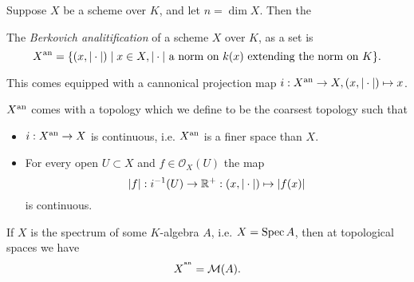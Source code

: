 
Suppose $X$ be a scheme over $K$, and let $n = \dim X$. 
Then the 
\begin{definition}
	The \emph{Berkovich analitification} of a scheme $X$ over  $K$, as a set is \[
		X{}^{\text{an}} = \{(x, |\cdot |)  \mid x\in X, |\cdot | \text{ a norm on } k(x) \text{ extending the norm on }K \} 
	.\] 

	This comes equipped with a cannonical projection map $i: X{}^{\text{an}} \to X, (x, |\cdot |) \mapsto  x$.
	
	$X{}^{\text{an}} $ comes with a topology which we define to be the coarsest topology such that 
	\begin{itemize}
		\item $i: X{}^{\text{an}} \to X$ is continuous, i.e. $X{}^{\text{an}}$ is a finer space than  $X$. 
		\item For every open $U \subset X$ and $f \in \mathcal{O}_X(U)$ the map  \[
				|f|: i^{-1}(U) \to \mathbb{R}^{+}: (x, |\cdot |) \mapsto  |f(x)|
		\] 
		is continuous.
	\end{itemize}

\end{definition}

\begin{proposition}
\end{proposition}


\begin{remark}
	If $X$ is the spectrum of some $K$-algebra $A$, i.e. $X = \operatorname{Spec} A$, then at topological spaces  we have \[
		X^{{}^{\text{an}}} = \mathcal{M} (A)
	.\] 

\end{remark}
